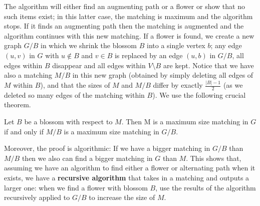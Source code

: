 \documentclass[12pt]{article}
\begin{document}
The algorithm will either find an augmenting path or a flower or show
that no such items exist; in this latter case, the matching is maximum
and the algorithm stops. If it finds an augmenting path then the
matching is augmented and the algorithm continues with this new
matching. If a flower is found, we
create a new graph $G/B$ in which we shrink the blossom $B$ into a single vertex
$b$; any edge $(u,v)$ in $G$ with $u\notin B$ and $v\in B$ is replaced
by an edge $(u,b)$ in $G/B$, all edges within $B$ disappear and all
edges within $V\setminus B$ are kept. Notice that we have also a
matching $M/B$ in this new graph (obtained by simply deleting all
edges of $M$ within $B$), and that the sizes of $M$ and $M/B$ differ
by exactly $\frac{|B|-1}{2}$ (as we deleted so many edges of the
matching within $B$). We use the following crucial theorem.

\begin{theorem} \label{thm:unshrink}
Let $B$ be a blossom with respect to $M$. 
Then M is a maximum size matching in $G$ if and only
if $M/B$ is a maximum size matching in $G/B$.
\end{theorem}

Moreover, the proof is algorithmic: If we have a bigger matching in
$G/B$ than $M/B$ then we also can find a bigger matching in $G$ than
$M$. This shows that, assuming we have an algorithm to find either a flower or alternating path when it exists, we have a \textbf{recursive algorithm} that takes in a matching and outputs a larger one: when we find a flower with blossom $B$, use the results of the algorithm recursively applied to $G/B$ to increase the size of $M$.\\
 
\end{document}
